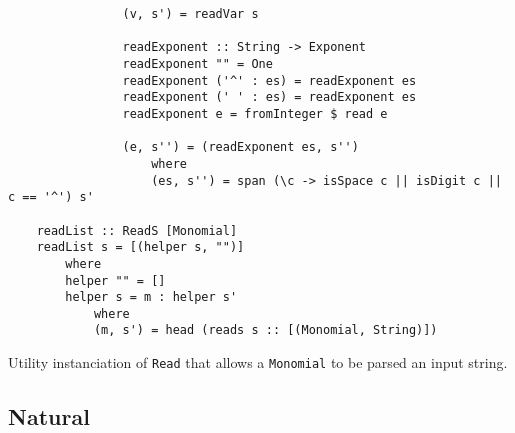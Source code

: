 \documentclass[11pt,a4paper]{article}
\begin{document}
\begin{itemize}
\begin{lstlisting}
                (v, s') = readVar s
    
                readExponent :: String -> Exponent
                readExponent "" = One
                readExponent ('^' : es) = readExponent es
                readExponent (' ' : es) = readExponent es
                readExponent e = fromInteger $ read e
    
                (e, s'') = (readExponent es, s'')
                    where
                    (es, s'') = span (\c -> isSpace c || isDigit c || c == '^') s'
    
    readList :: ReadS [Monomial]
    readList s = [(helper s, "")]
        where
        helper "" = []
        helper s = m : helper s'
            where
            (m, s') = head (reads s :: [(Monomial, String)])
    \end{lstlisting}

          Utility instanciation of \lstinline{Read} that allows a \lstinline{Monomial} to be parsed an input string.

\end{itemize}

\subsection{Natural}
\end{document}
